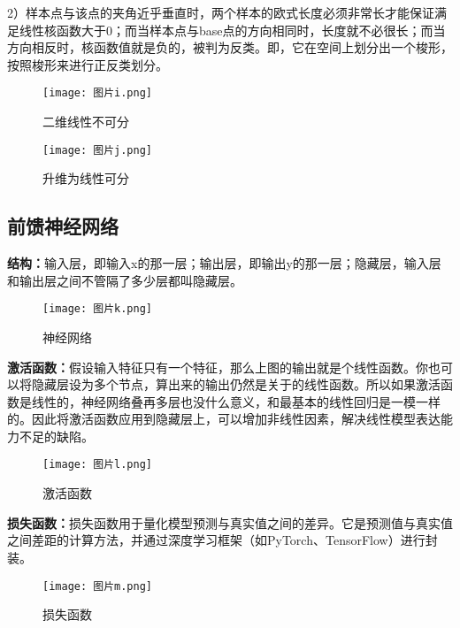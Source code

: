 \documentclass[10.5pt,compsoc,UTF8]{CjC}
\theoremstyle{mystyle}
\begin{document}
2）样本点与该点的夹角近乎垂直时，两个样本的欧式长度必须非常长才能保证满足线性核函数大于0；而当样本点与base点的方向相同时，长度就不必很长；而当方向相反时，核函数值就是负的，被判为反类。即，它在空间上划分出一个梭形，按照梭形来进行正反类划分。

\begin{figure}[h] %
    \centering %
    \texttt{[image: 图片i.png]} %
    \caption{二维线性不可分} %
\end{figure}

\begin{figure}[h] %
    \centering %
    \texttt{[image: 图片j.png]} %
    \caption{升维为线性可分} %
\end{figure}

\subsection{前馈神经网络}
\textbf{结构：}输入层，即输入x的那一层；输出层，即输出y的那一层；隐藏层，输入层和输出层之间不管隔了多少层都叫隐藏层。

\begin{figure}[h] %
    \centering %
    \texttt{[image: 图片k.png]} %
    \caption{神经网络} %
\end{figure}

\textbf{激活函数：}假设输入特征只有一个特征，那么上图的输出就是个线性函数。你也可以将隐藏层设为多个节点，算出来的输出仍然是关于的线性函数。所以如果激活函数是线性的，神经网络叠再多层也没什么意义，和最基本的线性回归是一模一样的。因此将激活函数应用到隐藏层上，可以增加非线性因素，解决线性模型表达能力不足的缺陷。

\begin{figure}[h] %
    \centering %
    \texttt{[image: 图片l.png]} %
    \caption{激活函数} %
\end{figure}

\textbf{损失函数：}损失函数用于量化模型预测与真实值之间的差异。它是预测值与真实值之间差距的计算方法，并通过深度学习框架（如PyTorch、TensorFlow）进行封装。

\begin{figure}[h] %
    \centering %
    \texttt{[image: 图片m.png]} %
    \caption{损失函数} %
\end{figure}
\end{document}
